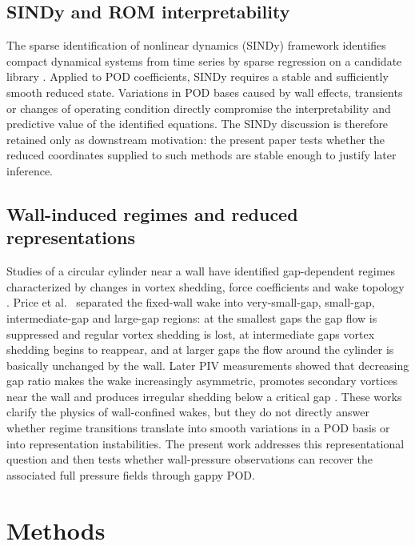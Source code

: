 \documentclass[preprint,12pt]{elsarticle}
\begin{document}
\subsection{SINDy and ROM interpretability}
\label{subsec2.3}
The sparse identification of nonlinear dynamics (SINDy) framework identifies compact dynamical systems from time series by sparse regression on a candidate library \citep{Brunton2016}. Applied to POD coefficients, SINDy requires a stable and sufficiently smooth reduced state. Variations in POD bases caused by wall effects, transients or changes of operating condition directly compromise the interpretability and predictive value of the identified equations. The SINDy discussion is therefore retained only as downstream motivation: the present paper tests whether the reduced coordinates supplied to such methods are stable enough to justify later inference.

\subsection{Wall-induced regimes and reduced representations}
\label{subsec2.4}
Studies of a circular cylinder near a wall have identified gap-dependent regimes characterized by changes in vortex shedding, force coefficients and wake topology \citep{Price2002,Chakraborty2004,Rao2013}. Price et al.~\citep{Price2002} separated the fixed-wall wake into very-small-gap, small-gap, intermediate-gap and large-gap regions: at the smallest gaps the gap flow is suppressed and regular vortex shedding is lost, at intermediate gaps vortex shedding begins to reappear, and at larger gaps the flow around the cylinder is basically unchanged by the wall. Later PIV measurements showed that decreasing gap ratio makes the wake increasingly asymmetric, promotes secondary vortices near the wall and produces irregular shedding below a critical gap \citep{He2017}. These works clarify the physics of wall-confined wakes, but they do not directly answer whether regime transitions translate into smooth variations in a POD basis or into representation instabilities. The present work addresses this representational question and then tests whether wall-pressure observations can recover the associated full pressure fields through gappy POD.

\section{Methods}
\label{sec3}
\end{document}
